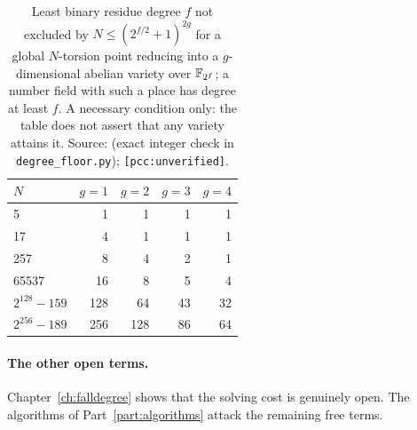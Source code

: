 \begin{table}[t]
\centering\small
\begin{tabular}{@{}lrrrr@{}}
\toprule
$N$ & $g=1$ & $g=2$ & $g=3$ & $g=4$ \\
\midrule
5 & 1 & 1 & 1 & 1 \\
17 & 4 & 1 & 1 & 1 \\
257 & 8 & 4 & 2 & 1 \\
65537 & 16 & 8 & 5 & 4 \\
$2^{128}-159$ & 128 & 64 & 43 & 32 \\
$2^{256}-189$ & 256 & 128 & 86 & 64 \\
\bottomrule
\end{tabular}
\caption[]{Least binary residue degree $f$ not excluded by
$N\le(2^{f/2}+1)^{2g}$ for a global $N$-torsion point reducing into a
$g$-dimensional abelian variety over $\mathbb{F}_{2^f}$; a number field with such
a place has degree at least $f$. A necessary condition only: the table
does not assert that any variety attains it. Source:
(exact integer check in \texttt{degree\_floor.py});
\texttt{[pcc:unverified]}.}
\label{tab:obs-crosschar}
\end{table}

\paragraph{The other open terms.} Chapter~\ref{ch:falldegree}
shows that the solving cost is genuinely open. The algorithms of
Part~\ref{part:algorithms} attack the remaining free terms.
